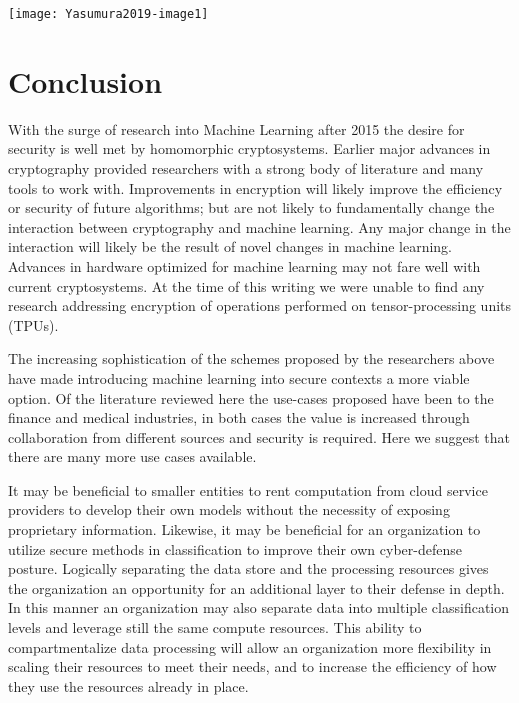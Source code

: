 \documentclass[]{article}
\begin{document}
\begingroup
	\vspace{1.5em}
	\centering
	\texttt{[image: Yasumura2019-image1]}
\endgroup

	
\section{Conclusion}

With the surge of research into Machine Learning after 2015 \cite{Perrault2019} the desire for security is well met by homomorphic cryptosystems.
Earlier major advances in cryptography provided researchers with a strong body of literature and many tools to work with.
Improvements in encryption will likely improve the efficiency or security of future algorithms; 
but are not likely to fundamentally change the interaction between cryptography and machine learning.
Any major change in the interaction will likely be the result of novel changes in machine learning.
Advances in hardware optimized for machine learning may not fare well with current cryptosystems.
At the time of this writing we were unable to find any research addressing encryption of operations performed on tensor-processing units (TPUs).

The increasing sophistication of the schemes proposed by the researchers above have made introducing machine learning into secure contexts a more viable option.
Of the literature reviewed here the use-cases proposed have been to the finance and medical industries,
in both cases the value is increased through collaboration from different sources and security is required. 
Here we suggest that there are many more use cases available.

It may be beneficial to smaller entities to rent computation from cloud service providers to develop their own models without the necessity of exposing proprietary information. 
Likewise, it may be beneficial for an organization to utilize secure methods in classification to improve their own cyber-defense posture.	
Logically separating the data store and the processing resources gives the organization an opportunity for an additional layer to their defense in depth.
In this manner an organization may also separate data into multiple classification levels and leverage still the same compute resources.
This ability to compartmentalize data processing will allow an organization more flexibility in scaling their resources to meet their needs, 
and to increase the efficiency of how they use the resources already in place.

\clearpage


\end{document}

